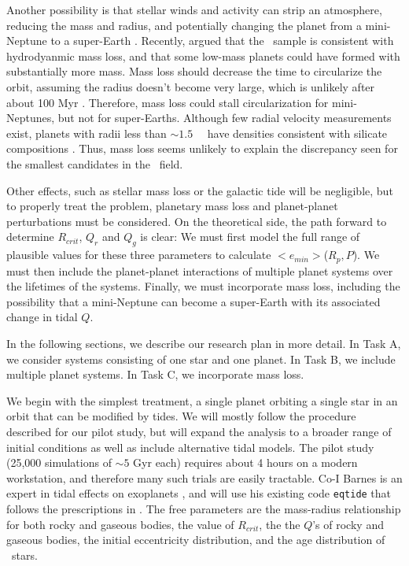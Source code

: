 Another possibility is that stellar winds and activity can strip an
atmosphere, reducing the mass and radius, and potentially changing the
planet from a mini-Neptune to a super-Earth
\cite{Jackson10,Valencia10,Leitzinger11,Poppenhaeger12}. Recently,
\cite{OwenWu13} argued that the \kepler~sample is consistent with
hydrodyanmic mass loss, and that some low-mass planets could have
formed with substantially more mass. Mass loss should decrease the
time to circularize the orbit, assuming the radius doesn't become very
large, which is unlikely after about 100 Myr
\cite{Lopez12}. Therefore, mass loss could stall circularization for
mini-Neptunes, but not for super-Earths. Although few radial velocity
measurements exist, planets with radii less than $\sim 1.5$~\rearth~
have densities consistent with silicate compositions
\cite{Batalha10}. Thus, mass loss seems unlikely to explain the
discrepancy seen for the smallest candidates in the \kepler~field.

Other effects, such as stellar mass loss or the galactic tide will be
negligible, but to properly treat the problem, planetary mass loss and
planet-planet perturbations must be considered. On the theoretical
side, the path forward to determine $R_{crit}$, $Q_{r}$ and $Q_{g}$ is
clear: We must first model the full range of plausible values for
these three parameters to calculate $<e_{min}>$($R_p,P$). We must then
include the planet-planet interactions of multiple planet systems over
the lifetimes of the systems. Finally, we must incorporate mass loss,
including the possibility that a mini-Neptune can become a super-Earth
with its associated change in tidal $Q$.

In the following sections, we describe our research plan in more
detail. In Task A, we consider systems consisting of one star and one
planet. In Task B, we include multiple planet systems. In Task C, we
incorporate mass loss. 

\medskip
{\centerline{}}
\smallskip

We begin with the simplest treatment, a single planet orbiting a
single star in an orbit that can be modified by tides. We will mostly
follow the procedure described for our pilot study, but will expand
the analysis to a broader range of initial conditions as well as
include alternative tidal models. The pilot study (25,000 simulations
of $\sim 5$ Gyr each) requires about 4 hours on a modern workstation,
and therefore many such trials are easily tractable. Co-I Barnes is an
expert in tidal effects on exoplanets
\cite{Barnes08,Jackson08a,Barnes09,Barnes12}, and will use his
existing code \texttt{eqtide} that follows the prescriptions in
\cite{Barnes12}. The free parameters are the mass-radius relationship
for both rocky and gaseous bodies, the value of $R_{crit}$, the the
$Q$'s of rocky and gaseous bodies, the initial eccentricity
distribution, and the age distribution of \kepler~stars.

